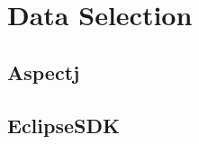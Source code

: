 \chapter{Data Selection}
\ifpdf
    \graphicspath{{Chapter5/Chapter5Figs/PNG/}{Chapter5/Chapter5Figs/PDF/}{Chapter5/Chapter5Figs/}}
\else
    \graphicspath{{Chapter5/Chapter5Figs/EPS/}{Chapter5/Chapter5Figs/}}
\fi

\section{Aspectj}

\section{EclipseSDK}




